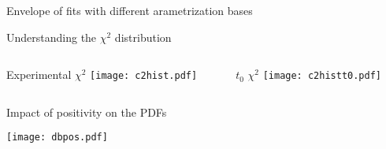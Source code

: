 \begin{frame}{Envelope of fits with different arametrization bases}
\end{frame}


\begin{frame}{Understanding the $\chi^2$ distribution}
  \begin{columns}
      \begin{column}[T]{0.48\textwidth}
          \centering
          Experimental $\chi^2$
          \texttt{[image: c2hist.pdf]}
      \end{column}
      \begin{column}[T]{0.48\textwidth}
          \centering
          $t_0$ $\chi^2$
          \texttt{[image: c2histt0.pdf]}
      \end{column}
  \end{columns}
\end{frame}


\begin{frame}[t]{Impact of positivity on the PDFs}
  \begin{center}
      \texttt{[image: dbpos.pdf]}
  \end{center}
\end{frame}


